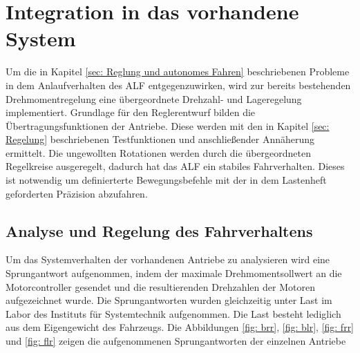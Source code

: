 \chapter{Integration in das vorhandene System}
\label{ch:Implementierung}
	Um die in Kapitel \ref{sec: Reglung und autonomes Fahren} beschriebenen Probleme in dem Anlaufverhalten des ALF
	entgegenzuwirken, wird zur bereits bestehenden Drehmomentregelung eine übergeordnete Drehzahl- und Lageregelung implementiert. Grundlage für den Reglerentwurf bilden die Übertragungsfunktionen der Antriebe. Diese werden mit den in Kapitel \ref{sec: Regelung} beschriebenen Testfunktionen und anschließender Annäherung ermittelt. Die ungewollten Rotationen werden durch die übergeordneten Regelkreise ausgeregelt, dadurch hat das ALF ein stabiles Fahrverhalten. Dieses ist notwendig um definierterte Bewegungsbefehle mit der in dem Lastenheft geforderten Präzision abzufahren.

	\section{Analyse und Regelung des Fahrverhaltens}
	\label{sec:Schlupfregelung}

	Um das Systemverhalten der vorhandenen Antriebe zu analysieren wird eine Sprungantwort aufgenommen,
	indem der maximale Drehmomentsollwert an die Motorcontroller
	gesendet und die resultierenden Drehzahlen der Motoren aufgezeichnet wurde. Die Sprungantworten wurden gleichzeitig unter Last im Labor des Instituts für Systemtechnik aufgenommen. Die Last besteht lediglich aus dem Eigengewicht des Fahrzeugs. Die Abbildungen \ref{fig: brr}, \ref{fig: blr}, \ref{fig: frr} und \ref{fig: flr} zeigen die aufgenommenen Sprungantworten der einzelnen Antriebe
			
